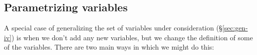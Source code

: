 \documentclass[12pt]{article}
\begin{document}











\subsection{Parametrizing variables}
\label{sec:gen-param}

A special case of generalizing the set of variables under
consideration (\S\ref{sec:gen-iv}) is when we don't add any new variables, but
we change the definition of some of the variables. There are two main
ways in which we might do this:
\end{document}
